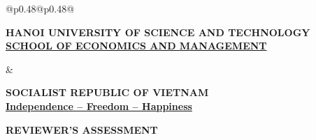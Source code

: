 \thispagestyle{empty}
\begin{center}
    \begin{tabular}{@{}p{0.48\textwidth}@{\hspace{0.04\textwidth}}p{0.48\textwidth}@{}}
        \begin{minipage}[t]{\linewidth}
            \centering
            {\fontsize{10pt}{15.6pt}\selectfont\textbf{HANOI UNIVERSITY OF SCIENCE AND TECHNOLOGY}} \\[0.2em]
            {\fontsize{10pt}{15.6pt}\underline{\textbf{SCHOOL OF ECONOMICS AND MANAGEMENT}}}
        \end{minipage}
        &
        \begin{minipage}[t]{\linewidth}
            \centering
            {\fontsize{10pt}{15.6pt}\selectfont\textbf{SOCIALIST REPUBLIC OF VIETNAM}} \\[0.2em]
            {\fontsize{10pt}{15.6pt}\underline{\textbf{Independence -- Freedom -- Happiness}}}
        \end{minipage}
    \end{tabular}
\end{center}

\begin{center}
\textbf{\LARGE REVIEWER'S ASSESSMENT}
\end{center}

